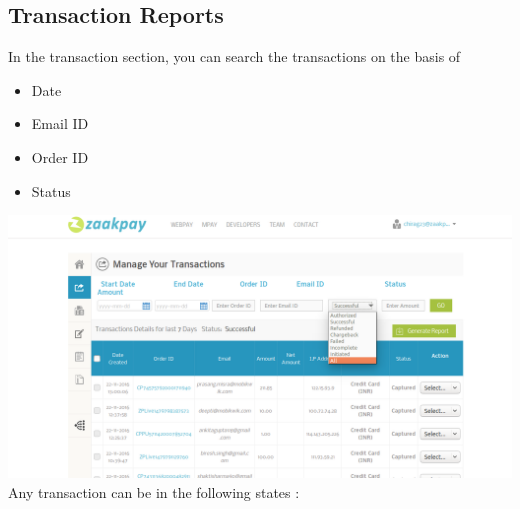 \documentclass{article}
\begin{document}
\subsection{Transaction Reports}
 In the transaction section, you can search the transactions on the basis of
\begin{itemize}
\item Date
\item Email ID
\item Order ID
\item Status
\end{itemize}
\includegraphics[width=6.5 in,height=3.4 in]{transactions.png}
\newpage
Any transaction can be in the following states :
\end{document}
